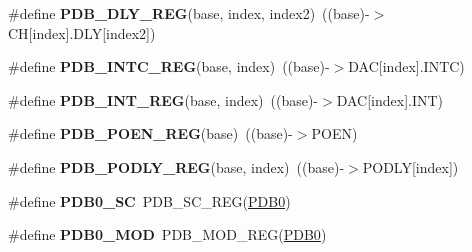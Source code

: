 \begin{DoxyCompactItemize}
\item 
\#define {\bfseries P\+D\+B\+\_\+\+D\+L\+Y\+\_\+\+R\+EG}(base,  index,  index2)~((base)-\/$>$CH\mbox{[}index\mbox{]}.D\+LY\mbox{[}index2\mbox{]})\hypertarget{group__PDB__Register__Accessor__Macros_ga27c7be99d84d8016b0af702669b1dfff}{}\label{group__PDB__Register__Accessor__Macros_ga27c7be99d84d8016b0af702669b1dfff}

\item 
\#define {\bfseries P\+D\+B\+\_\+\+I\+N\+T\+C\+\_\+\+R\+EG}(base,  index)~((base)-\/$>$D\+AC\mbox{[}index\mbox{]}.I\+N\+TC)\hypertarget{group__PDB__Register__Accessor__Macros_gad8cf9355314d5d8eda1da8b64f527d8d}{}\label{group__PDB__Register__Accessor__Macros_gad8cf9355314d5d8eda1da8b64f527d8d}

\item 
\#define {\bfseries P\+D\+B\+\_\+\+I\+N\+T\+\_\+\+R\+EG}(base,  index)~((base)-\/$>$D\+AC\mbox{[}index\mbox{]}.I\+NT)\hypertarget{group__PDB__Register__Accessor__Macros_gabee8b6b67f9f49f1e42f953b88d604fc}{}\label{group__PDB__Register__Accessor__Macros_gabee8b6b67f9f49f1e42f953b88d604fc}

\item 
\#define {\bfseries P\+D\+B\+\_\+\+P\+O\+E\+N\+\_\+\+R\+EG}(base)~((base)-\/$>$P\+O\+EN)\hypertarget{group__PDB__Register__Accessor__Macros_gaf69ba26710c2972c452838f14e5f813f}{}\label{group__PDB__Register__Accessor__Macros_gaf69ba26710c2972c452838f14e5f813f}

\item 
\#define {\bfseries P\+D\+B\+\_\+\+P\+O\+D\+L\+Y\+\_\+\+R\+EG}(base,  index)~((base)-\/$>$P\+O\+D\+LY\mbox{[}index\mbox{]})\hypertarget{group__PDB__Register__Accessor__Macros_gadac4e6d18a0b708eb433e82b504a8ff6}{}\label{group__PDB__Register__Accessor__Macros_gadac4e6d18a0b708eb433e82b504a8ff6}

\item 
\#define {\bfseries P\+D\+B0\+\_\+\+SC}~P\+D\+B\+\_\+\+S\+C\+\_\+\+R\+EG(\hyperlink{group__PDB__Peripheral__Access__Layer_ga91cdd5c74efea207fd5cf60bb271b90c}{P\+D\+B0})\hypertarget{group__PDB__Register__Accessor__Macros_ga033ea8777ba5d2f3491be5723fc6eea5}{}\label{group__PDB__Register__Accessor__Macros_ga033ea8777ba5d2f3491be5723fc6eea5}

\item 
\#define {\bfseries P\+D\+B0\+\_\+\+M\+OD}~P\+D\+B\+\_\+\+M\+O\+D\+\_\+\+R\+EG(\hyperlink{group__PDB__Peripheral__Access__Layer_ga91cdd5c74efea207fd5cf60bb271b90c}{P\+D\+B0})\hypertarget{group__PDB__Register__Accessor__Macros_gacefe5da9a5646a5e2317c2c5c26ddb9a}{}\label{group__PDB__Register__Accessor__Macros_gacefe5da9a5646a5e2317c2c5c26ddb9a}


\end{DoxyCompactItemize}
